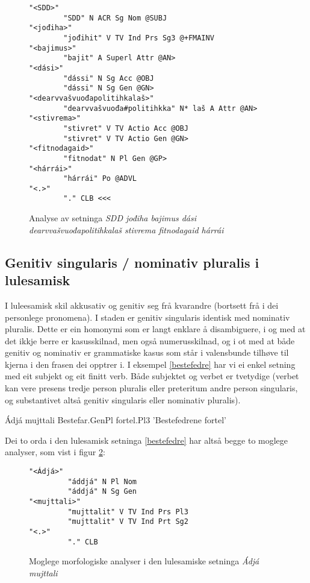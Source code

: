 \documentclass[a4paper,nynorsk]{article}
\begin{document}
\begin{figure}[htbp]
\begin{center}
\begin{verbatim}
"<SDD>"
        "SDD" N ACR Sg Nom @SUBJ
"<jođiha>"
        "jođihit" V TV Ind Prs Sg3 @+FMAINV
"<bajimus>"
        "bajit" A Superl Attr @AN>
"<dási>"
        "dássi" N Sg Acc @OBJ
        "dássi" N Sg Gen @GN>
"<dearvvašvuođapolitihkalaš>"
        "dearvvašvuođa#politihkka" N* laš A Attr @AN>
"<stivrema>"
        "stivret" V TV Actio Acc @OBJ
        "stivret" V TV Actio Gen @GN>
"<fitnodagaid>"
        "fitnodat" N Pl Gen @GP>
"<hárrái>"
        "hárrái" Po @ADVL
"<.>"
        "." CLB <<<
\end{verbatim}
\caption{Analyse av setninga \textit{SDD jođiha bajimus dási dearvvašvuođapolitihkalaš stivrema fitnodagaid hárrái}}
\label{SDD2-a}
\end{center}
\end{figure}



\subsection{Genitiv singularis / nominativ pluralis i lulesamisk}

I luleesamisk skil akkusativ og genitiv seg frå kvarandre (bortsett frå i dei personlege pronomena). I staden er genitiv singularis identisk med nominativ pluralis. Dette er ein homonymi som er langt enklare å disambiguere, i og med at det ikkje berre er kasusskilnad, men også numerusskilnad, og i ot med at både genitiv og nominativ er  grammatiske kasus som står i valensbunde tilhøve til kjerna i den frasen dei opptrer i. I eksempel \ref{bestefedre} har vi ei enkel setning med eit subjekt og eit finitt verb. Både subjektet og verbet er tvetydige (verbet kan vere presens tredje person pluralis eller preteritum andre person singularis, og substantivet altså genitiv singularis eller nominativ pluralis). %

\begin{example}\label{bestefedre}
\gll Ádjá mujttali
    Bestefar.GenPl fortel.Pl3
\glt 'Bestefedrene fortel'    
\glend
\end{example}%

Dei to orda i den lulesamisk setninga \ref{bestefedre} har altså begge to moglege analyser, som vist i figur \ref{am-multi}:

\begin{figure}[htbp]
\begin{center}
\begin{verbatim}
"<Ádjá>"
         "áddjá" N Pl Nom
         "áddjá" N Sg Gen
"<mujttali>"
         "mujttalit" V TV Ind Prs Pl3
         "mujttalit" V TV Ind Prt Sg2
"<.>"
         "." CLB
\end{verbatim}
\caption{Moglege morfologiske analyser i den lulesamiske setninga \textit{Ádjá mujttali}}
\label{am-multi}
\end{center}
\end{figure}
\end{document}
